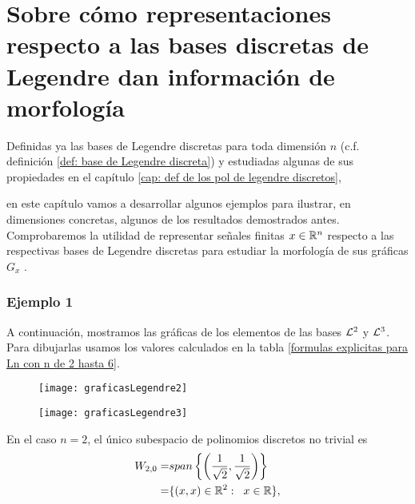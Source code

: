 \chapter{Sobre cómo representaciones respecto a las bases discretas de Legendre dan información de morfología}
\label{sec: ejemplos}


Definidas ya las bases de Legendre discretas
para toda dimensión $n$ 
(c.f. definición  
\ref{def: base de Legendre discreta}) y estudiadas algunas de sus 
propiedades en el capítulo 
\ref{cap: def de los pol de legendre discretos},{
en este capítulo vamos a desarrollar algunos ejemplos 
para ilustrar, en dimensiones concretas, algunos de los
resultados demostrados antes.
Comprobaremos la utilidad de 
representar señales finitas $ x \in \mathbb{R}^{n}$ respecto
a las respectivas bases de Legendre discretas para
estudiar la morfología de sus gráficas $G_{x}$
.


\subsection{Ejemplo 1}
\label{subs: ejm 1}

A continuación, mostramos las gráficas de los
elementos de las bases $\mathcal{L}^{2}$ y $\mathcal{L}^{3}$.
Para dibujarlas usamos los valores
calculados en la tabla
\ref{formulas explicitas para Ln con n de 2 hasta 6}.

\begin{figure}[H]
	\centering
	\texttt{[image: graficasLegendre2]} 
\end{figure}	


\begin{figure}[H]
	\centering
	\texttt{[image: graficasLegendre3]} 
\end{figure}	




En el caso $n=2$, el único subespacio de polinomios
discretos no trivial es 
\begin{align*}
W_{2,0}= & span \left\{ 
\left(\frac{1}{\sqrt2}, \frac{1}{\sqrt2} \right) \right\} \\
= & \{ (x,x) \in \mathbb{R}^{2}: \hspace{0.2cm} x \in \mathbb{R} \},
\end{align*}

}
